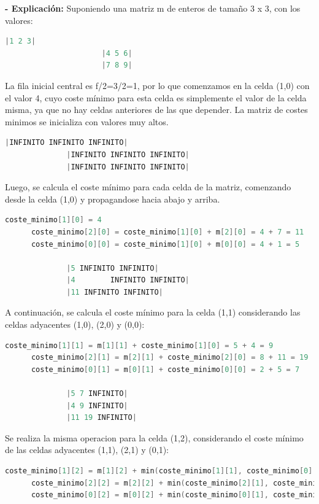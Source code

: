 \documentclass[12pt, letterpaper]{article}
\begin{document}
\begin{itemize}
          \subitem\textbf{- Explicación:}\newline
            Suponiendo una matriz m de enteros de tamaño 3 x 3, con los valores:
            \begin{lstlisting}[language=C++, basicstyle=\ttfamily\footnotesize,breaklines=true]
                      |1 2 3|
                      |4 5 6|
                      |7 8 9|
            \end{lstlisting}
            La fila inicial central es f/2=3/2=1, por lo que comenzamos en la celda (1,0) con el valor 4,
            cuyo coste mínimo para esta celda es simplemente el valor de la celda misma, ya que no hay celdas anteriores de las que depender.\newline
            La matriz de costes minimos se inicializa con valores muy altos.
            \begin{lstlisting}[language=C++, basicstyle=\ttfamily\footnotesize,breaklines=true]
              |INFINITO INFINITO INFINITO|
              |INFINITO INFINITO INFINITO|
              |INFINITO INFINITO INFINITO|
            \end{lstlisting}
            Luego, se calcula el coste mínimo para cada celda de la matriz, comenzando desde la celda (1,0) y propagandose hacia abajo y arriba.
            \begin{lstlisting}[language=C++, basicstyle=\ttfamily\footnotesize,breaklines=true]
      coste_minimo[1][0] = 4
      coste_minimo[2][0] = coste_minimo[1][0] + m[2][0] = 4 + 7 = 11
      coste_minimo[0][0] = coste_minimo[1][0] + m[0][0] = 4 + 1 = 5

              |5 INFINITO INFINITO|
              |4        INFINITO INFINITO|
              |11 INFINITO INFINITO|
            \end{lstlisting}
  \newpage %
            A continuación, se calcula el coste mínimo para la celda (1,1) considerando las celdas adyacentes (1,0), (2,0) y (0,0):
            \begin{lstlisting}[language=C++, basicstyle=\ttfamily\footnotesize,breaklines=true]
      coste_minimo[1][1] = m[1][1] + coste_minimo[1][0] = 5 + 4 = 9
      coste_minimo[2][1] = m[2][1] + coste_minimo[2][0] = 8 + 11 = 19
      coste_minimo[0][1] = m[0][1] + coste_minimo[0][0] = 2 + 5 = 7
      
              |5 7 INFINITO|
              |4 9 INFINITO|
              |11 19 INFINITO|
            \end{lstlisting}
            Se realiza la misma operacion para la celda (1,2), considerando el coste mínimo de las celdas adyacentes (1,1), (2,1) y (0,1):
            \begin{lstlisting}[language=C++, basicstyle=\ttfamily\footnotesize,breaklines=true]
      coste_minimo[1][2] = m[1][2] + min(coste_minimo[1][1], coste_minimo[0][1], coste_minimo[2][1]) = 6 + min(9, 7, 19) = 6 + 7 = 13
      coste_minimo[2][2] = m[2][2] + min(coste_minimo[2][1], coste_minimo[1][1], coste_minimo[0][1]) = 9 + min(19, 9, 7) = 9 + 7 = 16
      coste_minimo[0][2] = m[0][2] + min(coste_minimo[0][1], coste_minimo[1][1], coste_minimo[2][1]) = 3 + min(7, 9, 19) = 3 + 7 = 10
      

\end{lstlisting}
\end{itemize}
\end{document}
